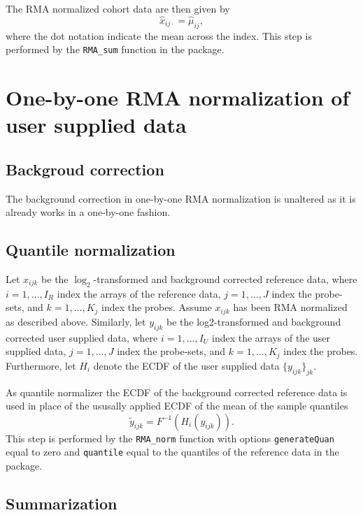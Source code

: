 The RMA normalized cohort data are then given by
\begin{equation*}
   \hat{x}_{ij\cdot} = \hat{\mu}_{ij},
\end{equation*}
where the dot notation indicate the mean across the index.
This step is performed by the \texttt{RMA\_sum} function in the \hemaClass{} package.




\section{One-by-one RMA normalization of user supplied data}
\subsection{Backgroud correction}

The background correction in one-by-one RMA normalization is unaltered as it is already works in a one-by-one fashion.


\subsection{Quantile normalization}

Let $x_{ijk}$ be the $\log_2$-transformed and background corrected reference data, where $i = 1,\dots,I_R$ index the arrays of the reference data, $j=1,\dots,J$ index the probe-sets, and $k=1,\dots,K_j$ index the probes.
Assume $x_{ijk}$ has been RMA normalized as described above.
Similarly, let $y_{ijk}$ be the log2-transformed and background corrected user supplied data, where $i = 1,\dots,I_U$ index the arrays of the user supplied data, $j=1,\dots,J$  index the probe-sets, and $k=1,\dots,K_j$ index the probes.
Furthermore, let $H_i$ denote the ECDF of the user supplied data $\{y_{ijk}\}_{jk}$.

As quantile normalizer the ECDF of the background corrected reference data is used in place of the ususally applied ECDF of the mean of the sample quantiles
\begin{equation*}
   \tilde{y}_{ijk} = F^{-1}(H_i(y_{ijk})).
\end{equation*}
This step is performed by the \texttt{RMA\_norm} function with options \texttt{generateQuan} equal to zero and \texttt{quantile} equal to the quantiles of the reference data in the  package.


\subsection{Summarization}

